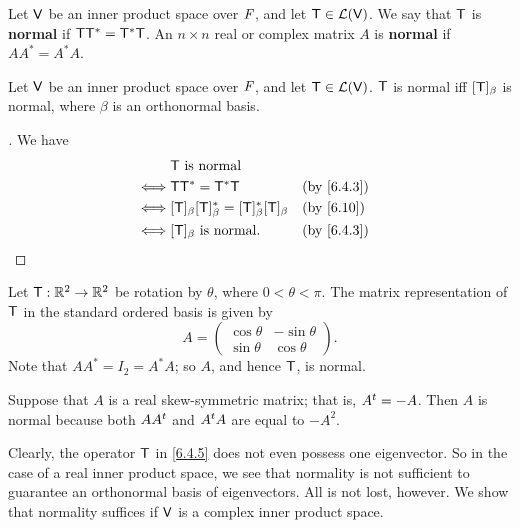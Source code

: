 \begin{defn}\label{6.4.3}
  Let \(\mathsf{V}\) be an inner product space over \(\mathit{F}\), and let \(\mathsf{T} \in \mathcal{L}(\mathsf{V})\).
  We say that \(\mathsf{T}\) is \textbf{normal} if \(\mathsf{T} \mathsf{T}^* = \mathsf{T}^* \mathsf{T}\).
  An \(n \times n\) real or complex matrix \(A\) is \textbf{normal} if \(A A^* = A^* A\).
\end{defn}

\begin{cor}\label{6.4.4}
  Let \(\mathsf{V}\) be an inner product space over \(\mathit{F}\), and let \(\mathsf{T} \in \mathcal{L}(\mathsf{V})\).
  \(\mathsf{T}\) is normal iff \([\mathsf{T}]_{\beta}\) is normal, where \(\beta\) is an orthonormal basis.
\end{cor}

\begin{proof}[]
  We have
  \begin{align*}
         & \T \text{ is normal}                                                      \\
    \iff & \T \T^* = \T^* \T                                         &  & \by{6.4.3} \\
    \iff & [\T]_{\beta} [\T]_{\beta}^* = [\T]_{\beta}^* [\T]_{\beta} &  & \by{6.10}  \\
    \iff & [\T]_{\beta} \text{ is normal}.                           &  & \by{6.4.3}
  \end{align*}
\end{proof}

\begin{eg}\label{6.4.5}
  Let \(\mathsf{T} : \mathbb{R}^2 \to \mathbb{R}^2\) be rotation by \(\theta\), where \(0 < \theta < \pi\).
  The matrix representation of \(\mathsf{T}\) in the standard ordered basis is given by
  \[
    A = \begin{pmatrix}
      \cos\theta & -\sin\theta \\
      \sin\theta & \cos\theta
    \end{pmatrix}.
  \]
  Note that \(A A^* = I_2 = A^* A\);
  so \(A\), and hence \(\mathsf{T}\), is normal.
\end{eg}

\begin{eg}\label{6.4.6}
  Suppose that \(A\) is a real skew-symmetric matrix;
  that is, \({A}^{t} = -A\).
  Then \(A\) is normal because both \(A {A}^{t}\) and \({A}^{t} A\) are equal to \(-A^2\).
\end{eg}

\begin{note}
  Clearly, the operator \(\mathsf{T}\) in \cref{6.4.5} does not even possess one eigenvector.
  So in the case of a real inner product space, we see that normality is not sufficient to guarantee an orthonormal basis of eigenvectors.
  All is not lost, however.
  We show that normality suffices if \(\mathsf{V}\) is a complex inner product space.
\end{note}

